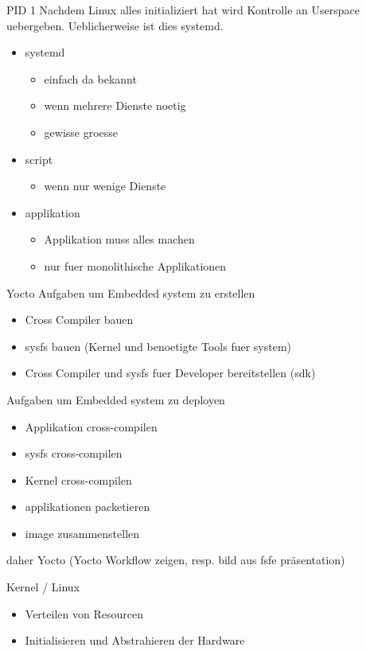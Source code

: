 \begin{frame}{PID 1}
	Nachdem Linux alles initializiert hat wird Kontrolle an Userspace uebergeben.
	Ueblicherweise ist dies systemd.
	\begin{itemize}
		\item systemd
		\begin{itemize}
			\item einfach da bekannt
			\item wenn mehrere Dienste noetig
			\item gewisse groesse
		\end{itemize}
		\item script
		\begin{itemize}
			\item wenn nur wenige Dienste
		\end{itemize}
		\item applikation
		\begin{itemize}
			\item Applikation muss alles machen
			\item nur fuer monolithische Applikationen
		\end{itemize}
	\end{itemize}
\end{frame}

\begin{frame}{Yocto}
	Aufgaben um Embedded system zu erstellen
	\begin{itemize}
		\item Cross Compiler bauen
		\item sysfs bauen (Kernel und benoetigte Tools fuer system)
		\item Cross Compiler und sysfs fuer Developer bereitstellen (sdk)
	\end{itemize}
	Aufgaben um Embedded system zu deployen
	\begin{itemize}
		\item Applikation cross-compilen
		\item sysfs cross-compilen
		\item Kernel cross-compilen
		\item applikationen packetieren
		\item image zusammenstellen
	\end{itemize}
	daher Yocto (Yocto Workflow zeigen, resp. bild aus fsfe präsentation)
\end{frame}

\begin{frame}{Kernel / Linux}
	\begin{itemize}
		\item Verteilen von Resourcen
		\item Initialisieren und Abstrahieren der Hardware
	\end{itemize}
\end{frame}

